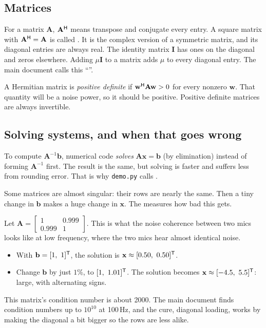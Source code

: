 \documentclass[11pt]{article}
\begin{document}
\subsection{Matrices}

For a matrix $\mathbf A$, $\mathbf A^{\mathsf H}$ means transpose and conjugate every entry. A square
matrix with $\mathbf A^{\mathsf H}=\mathbf A$ is called . It is the complex
version of a symmetric matrix, and its diagonal entries are always real. The identity matrix
$\mathbf I$ has ones on the diagonal and zeros elsewhere. Adding $\mu\mathbf I$ to a matrix adds
$\mu$ to every diagonal entry. The main document calls this ``''.

A Hermitian matrix is \emph{positive definite} if $\mathbf w^{\mathsf H}\mathbf A\mathbf w>0$ for every
nonzero $\mathbf w$. That quantity will be a noise power, so it should be positive. Positive
definite matrices are always invertible.

\subsection{Solving systems, and when that goes wrong}

To compute $\mathbf A^{-1}\mathbf b$, numerical code \emph{solves} $\mathbf A\mathbf x=\mathbf b$
(by elimination) instead of forming $\mathbf A^{-1}$ first. The result is the same, but solving
is faster and suffers less from rounding error. That is why \texttt{demo.py} calls
.

Some matrices are almost singular: their rows are nearly the same. Then a tiny change in
$\mathbf b$ makes a huge change in $\mathbf x$. The  measures how bad
this gets.

\begin{example}\label{ex:cond}
Let $\mathbf A=\begin{bmatrix}1&0.999\\0.999&1\end{bmatrix}$. This is what the noise coherence
between two mics looks like at low frequency, where the two mics hear almost identical noise.
\begin{itemize}[nosep]
\item With $\mathbf b=[1,\ 1]^{\mathsf T}$, the solution is $\mathbf x\approx[0.50,\ 0.50]\tr$.
\item Change $\mathbf b$ by just $1\%$, to $[1,\ 1.01]^{\mathsf T}$. The solution becomes
  $\mathbf x\approx[-4.5,\ 5.5]\tr$: large, with alternating signs.
\end{itemize}
This matrix's condition number is about 2000. The main document finds condition numbers up to
$10^{10}$ at 100\,Hz, and the cure, diagonal loading, works by making the diagonal a bit bigger
so the rows are less alike.
\end{example}
\end{document}

